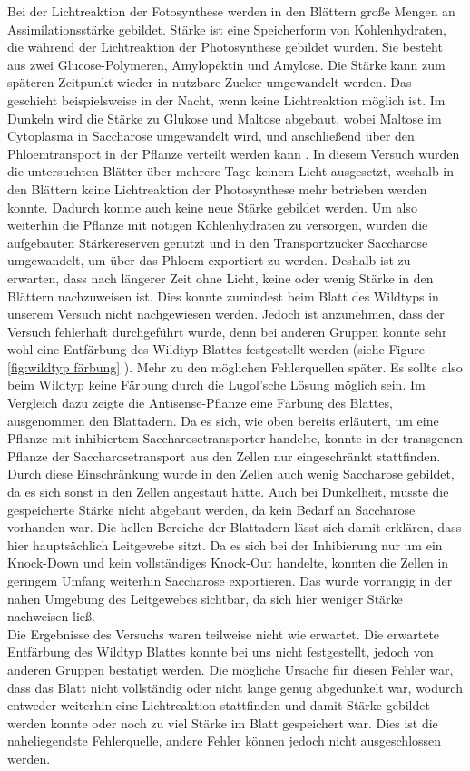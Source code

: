 \documentclass[10pt,a4paper]{article}
\begin{document}
	Bei der Lichtreaktion der Fotosynthese werden in den Blättern große Mengen an Assimilationsstärke gebildet. Stärke ist eine Speicherform von Kohlenhydraten, die während der Lichtreaktion der Photosynthese gebildet wurden. Sie besteht aus zwei Glucose-Polymeren, Amylopektin und Amylose. Die Stärke kann zum späteren Zeitpunkt wieder in nutzbare Zucker umgewandelt werden. Das geschieht beispielsweise in der Nacht, wenn keine Lichtreaktion möglich ist. Im Dunkeln wird die Stärke zu Glukose und Maltose abgebaut, wobei Maltose im Cytoplasma in Saccharose umgewandelt wird, und anschließend über den Phloemtransport in der Pflanze verteilt werden kann \cite{Kadereit} . In diesem Versuch wurden die untersuchten Blätter über mehrere Tage keinem Licht ausgesetzt, weshalb in den Blättern keine Lichtreaktion der Photosynthese mehr betrieben werden konnte. Dadurch konnte auch keine neue Stärke gebildet werden. Um also weiterhin die Pflanze mit nötigen Kohlenhydraten zu versorgen, wurden die aufgebauten Stärkereserven genutzt und in den Transportzucker Saccharose umgewandelt, um über das Phloem exportiert zu werden. Deshalb ist zu erwarten, dass nach längerer Zeit ohne Licht, keine oder wenig Stärke in den Blättern nachzuweisen ist. Dies konnte zumindest beim Blatt des Wildtyps in unserem Versuch nicht nachgewiesen werden. Jedoch ist anzunehmen, dass der Versuch fehlerhaft durchgeführt wurde, denn bei anderen Gruppen konnte sehr wohl eine Entfärbung des Wildtyp Blattes festgestellt werden (siehe Figure \ref{fig:wildtyp färbung} ). Mehr zu den möglichen Fehlerquellen später. Es sollte also beim Wildtyp keine Färbung durch die Lugol’sche Lösung möglich sein. Im Vergleich dazu zeigte die Antisense-Pflanze eine Färbung des Blattes, ausgenommen den Blattadern. Da es sich, wie oben bereits erläutert, um eine Pflanze mit inhibiertem Saccharosetransporter handelte, konnte in der transgenen Pflanze der Saccharosetransport aus den Zellen nur eingeschränkt stattfinden. Durch diese Einschränkung wurde in den Zellen auch wenig Saccharose gebildet, da es sich sonst in den Zellen angestaut hätte. Auch bei Dunkelheit, musste die gespeicherte Stärke nicht abgebaut werden, da kein Bedarf an Saccharose vorhanden war. Die hellen Bereiche der Blattadern lässt sich damit erklären, dass hier hauptsächlich Leitgewebe sitzt. Da es sich bei der Inhibierung nur um ein Knock-Down und kein vollständiges Knock-Out handelte, konnten die Zellen in geringem Umfang weiterhin Saccharose exportieren. Das wurde vorrangig in der nahen Umgebung des Leitgewebes sichtbar, da sich hier weniger Stärke nachweisen ließ.\\
	Die Ergebnisse des Versuchs waren teilweise nicht wie erwartet. Die erwartete Entfärbung des Wildtyp Blattes konnte bei uns nicht festgestellt, jedoch von anderen Gruppen bestätigt werden. Die mögliche Ursache für diesen Fehler war, dass das Blatt nicht vollständig oder nicht lange genug abgedunkelt war, wodurch entweder weiterhin eine Lichtreaktion stattfinden und damit Stärke gebildet werden konnte oder noch zu viel Stärke im Blatt gespeichert war. Dies ist die naheliegendste Fehlerquelle, andere Fehler können jedoch nicht ausgeschlossen werden.
	
\end{document}
